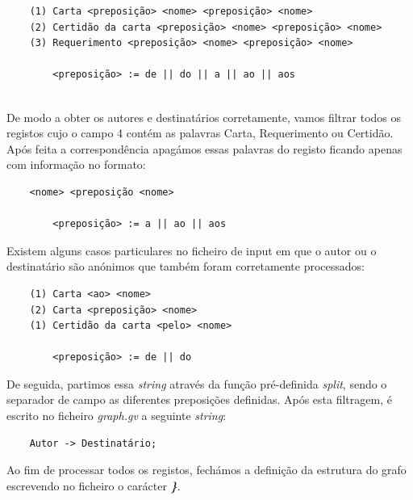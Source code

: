 \documentclass[11pt,a4paper]{report}
\begin{document}
\begin{verbatim}
    (1) Carta <preposição> <nome> <preposição> <nome>
    (2) Certidão da carta <preposição> <nome> <preposição> <nome>
    (3) Requerimento <preposição> <nome> <preposição> <nome>
    
        <preposição> := de || do || a || ao || aos 
    
\end{verbatim}

\quad De modo a obter os autores e destinatários corretamente, vamos filtrar todos os registos cujo o campo 4 contém as palavras Carta, Requerimento ou Certidão. Após feita a correspondência apagámos essas palavras do registo ficando apenas com informação no formato: 

\begin{verbatim}
    <nome> <preposição <nome>
    
        <preposição> := a || ao || aos
\end{verbatim}

Existem alguns casos particulares no ficheiro de input em que o autor ou o destinatário são anónimos que também foram corretamente processados:
\begin{verbatim}
    (1) Carta <ao> <nome>
    (2) Carta <preposição> <nome>
    (1) Certidão da carta <pelo> <nome>
    
        <preposição> := de || do
\end{verbatim}
\quad De seguida, partimos essa \textit{string} através da função pré-definida \textit{split}, sendo o separador de campo as diferentes preposições definidas. Após esta filtragem, é escrito no ficheiro \textit{graph.gv} a seguinte \textit{string}:

\begin{verbatim}
    Autor -> Destinatário;
\end{verbatim}

\quad Ao fim de processar todos os registos, fechámos a definição da estrutura do grafo escrevendo no ficheiro o carácter \textbf{\textit{\}}}.
\end{document}

